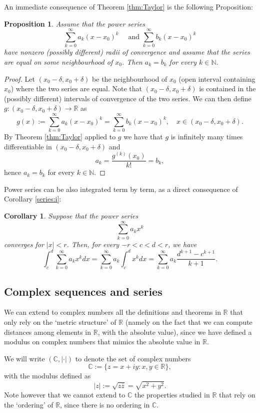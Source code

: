 \documentclass[a4paper,reqno]{amsart}
\numberwithin{equation}{section}
\newtheorem{proposition}[definition]{Proposition}
\newtheorem{corollary}[definition]{Corollary}
\def\C{\mathbb{C}}
\def\N{\mathbb{N}}
\def\R{\mathbb{R}}
\begin{document}
\medskip

An immediate consequence of Theorem \ref{thm:Taylor} is the following Proposition:

\begin{proposition}
Assume that the power series
$$
\sum_{k=0}^\infty a_k (x - x_0)^k \quad \textrm{ and } \sum_{k=0}^\infty b_k (x - x_0)^k
$$
have nonzero (possibly different) radii of convergence and assume that the series are equal on some neighbourhood of $x_0$. Then $a_k=b_k$ for every $k\in \N$.
\end{proposition}

\begin{proof}
Let $(x_0-\delta, x_0 +\delta)$ be the neighbourhood of $x_0$ (open interval containing $x_0$) where the two series are equal. Note that $(x_0-\delta, x_0+\delta)$
is contained in the (possibly different) intervals of convergence of the two series. We can then define $g: (x_0-\delta, x_0+\delta) \to \R$ as
$$
g(x):= \sum_{k=0}^\infty a_k (x - x_0)^k = \sum_{k=0}^\infty b_k (x - x_0)^k, \quad x\in (x_0-\delta, x_0+\delta).
$$
By Theorem \ref{thm:Taylor} applied to $g$ we have that $g$ is infinitely many times differentiable in $(x_0-\delta, x_0+\delta)$ and
$$
a_k = \frac{g^{(k)}(x_0)}{k!} = b_k,
$$
hence $a_k = b_k$ for every $k\in \N$.
\end{proof}

\bigskip

Power series can be also integrated term by term, as a direct consequence of Corollary \ref{series:i}:

\begin{corollary}
Suppose that the power series
$$
\sum_{k=0}^\infty a_k x^k
$$
converges for $|x|<r$. Then, for every $-r<c<d<r$, we have
$$
\int_c^d \sum_{k=0}^\infty a_k x^k dx = \sum_{k=0}^\infty a_k \int_c^d x^k dx = \sum_{k=0}^\infty a_k \frac{d^{k+1}-c^{k+1}}{k+1}.
$$
\end{corollary}


\subsection{Complex sequences and series}
We can extend to complex numbers all the definitions and theorems in $\R$ that only rely on the `metric structure' of $\R$ (namely on the fact that we can compute
distances among elements in $\R$, with the absolute value), since we have defined a modulus on complex numbers that mimics the absolute value in $\R$.
\smallskip

We will write $(\C, | \cdot|)$ to denote the set of complex numbers
$$\C:= \{z = x+i y: x, y\in \R\},$$
with the modulus defined as
$$|z|:= \sqrt{z\bar z} =\sqrt{x^2+y^2}.$$
Note however that we cannot extend to $\C$ the properties studied in $\R$ that rely on the `ordering' of $\R$, since there is no ordering in $\C$.
\end{document}
